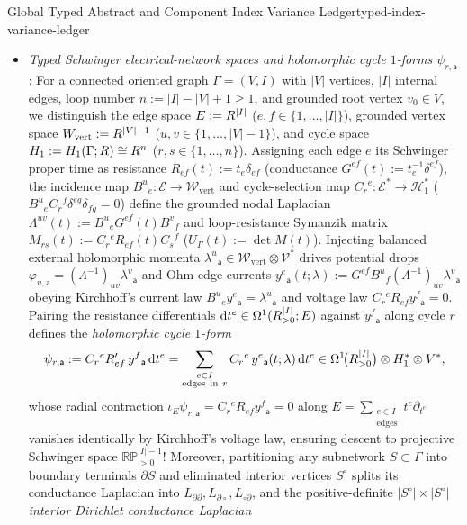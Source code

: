 \begin{zkmodule}{Global Typed Abstract and Component Index Variance Ledger}{typed-index-variance-ledger}
\begin{itemize}[leftmargin=*]
  \item \emph{Typed Schwinger electrical-network spaces and holomorphic cycle $1$-forms $\psi_{r,\mathsf{a}}$}: For a connected oriented graph $\Gamma = (V,I)$ with $|V|$ vertices, $|I|$ internal edges, loop number $n := |I| - |V| + 1 \ge 1$, and grounded root vertex $v_0 \in V$, we distinguish the edge space $E := R^{|I|}$ ($e,f \in \{1,\dots,|I|\}$), grounded vertex space $W_{\mathrm{vert}} := R^{|V|-1}$ ($u,v \in \{1,\dots,|V|-1\}$), and cycle space $H_1 := H_1(\Gamma;R) \cong R^n$ ($r,s \in \{1,\dots,n\}$). Assigning each edge $e$ its Schwinger proper time as resistance $R_{ef}(t) := t_e\delta_{ef}$ (conductance $G^{ef}(t) := t_e^{-1}\delta^{ef}$), the incidence map $B^u{}_e : \mathcal{E} \to \mathcal{W}_{\mathrm{vert}}$ and cycle-selection map $C_r{}^e : \mathcal{E}^* \to \mathcal{H}_1^*$ ($B^u{}_e C_r{}^f\delta^{eg}\delta_{fg} = 0$) define the grounded nodal Laplacian $\Lambda^{uv}(t) := B^u{}_e G^{ef}(t) B^v{}_f$ and loop-resistance Symanzik matrix $M_{rs}(t) := C_r{}^e R_{ef}(t) C_s{}^f$ ($U_\Gamma(t) := \det M(t)$). Injecting balanced external holomorphic momenta $\lambda^u{}_{\mathsf{a}} \in \mathcal{W}_{\mathrm{vert}}\otimes\mathcal{V}^*$ drives potential drops $\varphi_{u,\mathsf{a}} = (\Lambda^{-1})_{uv}\lambda^v{}_{\mathsf{a}}$ and Ohm edge currents $y^e{}_{\mathsf{a}}(t;\lambda) := G^{ef}B^u{}_f(\Lambda^{-1})_{uv}\lambda^v{}_{\mathsf{a}}$ obeying Kirchhoff's current law $B^u{}_e y^e{}_{\mathsf{a}} = \lambda^u{}_{\mathsf{a}}$ and voltage law $C_r{}^e R_{ef} y^f{}_{\mathsf{a}} = 0$. Pairing the resistance differentials $\mathrm{d} t^e \in \Omega^1(R^{|I|}_{>0};E)$ against $y^f{}_{\mathsf{a}}$ along cycle $r$ defines the \emph{holomorphic cycle $1$-form}
  \begin{equation}
  \label{eq:psi-cycle-def}
  \psi_{r,\mathsf{a}} := C_r{}^e R_{ef}'\,y^f{}_{\mathsf{a}}\,\mathrm{d} t^e = \sum_{\substack{e \in I\\\mathrm{edges\ in\ }r}} C_r{}^e\,y^e{}_{\mathsf{a}}(t;\lambda)\,\mathrm{d} t^e \in \Omega^1\!\bigl(R^{|I|}_{>0}\bigr)\otimes H_1^*\otimes V^*,
  \end{equation}
  whose radial contraction $\iota_E\psi_{r,\mathsf{a}} = C_r{}^e R_{ef} y^f{}_{\mathsf{a}} = 0$ along $E = \sum_{\substack{e\in I\\\mathrm{edges}}} t^e\partial_{t^e}$ vanishes identically by Kirchhoff's voltage law, ensuring descent to projective Schwinger space $\mathbb{RP}^{|I|-1}_{>0}$! Moreover, partitioning any subnetwork $S \subset \Gamma$ into boundary terminals $\partial S$ and eliminated interior vertices $S^\circ$ splits its conductance Laplacian into $L_{\partial\partial}, L_{\partial\circ}, L_{\circ\partial}$, and the positive-definite $|S^\circ|\times|S^\circ|$ \emph{interior Dirichlet conductance Laplacian}

\end{itemize}
\end{zkmodule}
